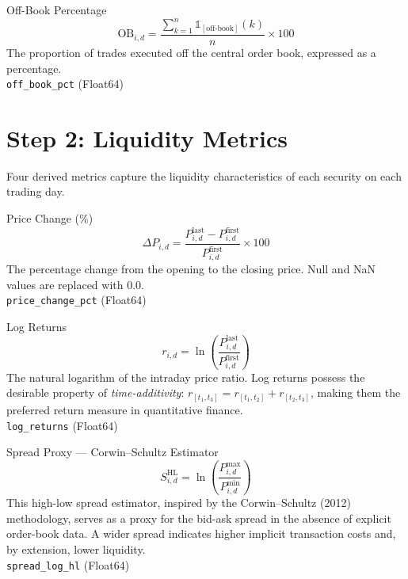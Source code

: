 \documentclass[
  11pt,
  a4paper,
  twoside,
  openany
]{report}
\begin{document}
\begin{formulabox}{Off-Book Percentage}
\[
  \text{OB}_{i,d} = \frac{\sum_{k=1}^{n} \mathbb{1}_{[\text{off-book}]}(k)}{n} \times 100
\]
The proportion of trades executed off the central order book, expressed as a percentage.\\[4pt]
\texttt{off\_book\_pct} (Float64)
\end{formulabox}

\section{Step 2: Liquidity Metrics}

Four derived metrics capture the liquidity characteristics of each security on each trading day.

\begin{formulabox}{Price Change (\%)}
\[
  \Delta P_{i,d} = \frac{P_{i,d}^{\text{last}} - P_{i,d}^{\text{first}}}{P_{i,d}^{\text{first}}} \times 100
\]
The percentage change from the opening to the closing price.  Null and NaN values are replaced with $0.0$.\\[4pt]
\texttt{price\_change\_pct} (Float64)
\end{formulabox}

\begin{formulabox}{Log Returns}
\[
  r_{i,d} = \ln\!\left(\frac{P_{i,d}^{\text{last}}}{P_{i,d}^{\text{first}}}\right)
\]
The natural logarithm of the intraday price ratio.  Log returns possess the desirable property of \emph{time-additivity}: $r_{[t_1, t_3]} = r_{[t_1, t_2]} + r_{[t_2, t_3]}$, making them the preferred return measure in quantitative finance.\\[4pt]
\texttt{log\_returns} (Float64)
\end{formulabox}

\begin{formulabox}{Spread Proxy — Corwin–Schultz Estimator}
\[
  S_{i,d}^{\text{HL}} = \ln\!\left(\frac{P_{i,d}^{\max}}{P_{i,d}^{\min}}\right)
\]
This high-low spread estimator, inspired by the Corwin--Schultz (2012) methodology, serves as a proxy for the bid-ask spread in the absence of explicit order-book data.  A wider spread indicates higher implicit transaction costs and, by extension, lower liquidity.\\[4pt]
\texttt{spread\_log\_hl} (Float64)
\end{formulabox}
\end{document}
